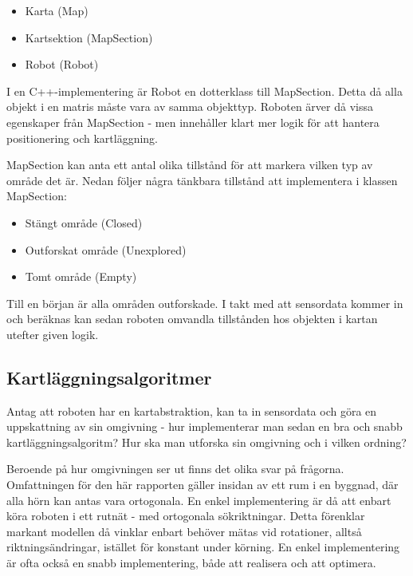 \documentclass[a4paper,12pt,fleqn]{article}
\begin{document}
\begin{itemize}
	\item Karta (Map)
	\item Kartsektion (MapSection)
	\item Robot (Robot)
\end{itemize}

I en C++-implementering är Robot en dotterklass till MapSection. Detta då alla objekt i en matris måste vara av samma objekttyp. Roboten ärver då vissa egenskaper från MapSection - men innehåller klart mer logik för att hantera positionering och kartläggning. 

MapSection kan anta ett antal olika tillstånd för att markera vilken typ av område det är. Nedan följer några tänkbara tillstånd att implementera i klassen MapSection: 

\begin{itemize}
	\item Stängt område (Closed)
	\item Outforskat område (Unexplored)
	\item Tomt område (Empty)
\end{itemize}

Till en början är alla områden outforskade. I takt med att sensordata kommer in och beräknas kan sedan roboten omvandla tillstånden hos objekten i kartan utefter given logik. 


\newpage
\subsection{Kartläggningsalgoritmer}

Antag att roboten har en kartabstraktion, kan ta in sensordata och göra en uppskattning av sin omgivning - hur implementerar man sedan en bra och snabb kartläggningsalgoritm? Hur ska man utforska sin omgivning och i vilken ordning? 

Beroende på hur omgivningen ser ut finns det olika svar på frågorna. Omfattningen för den här rapporten gäller insidan av ett rum i en byggnad, där alla hörn kan antas vara ortogonala. En enkel implementering är då att enbart köra roboten i ett rutnät - med ortogonala sökriktningar. Detta förenklar markant modellen då vinklar enbart behöver mätas vid rotationer, alltså riktningsändringar, istället för konstant under körning. En enkel implementering är ofta också en snabb implementering, både att realisera och att optimera. 
\end{document}
